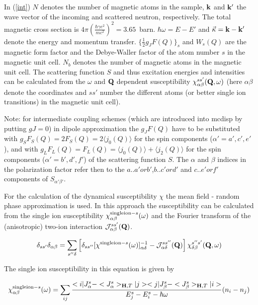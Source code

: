 
In (\ref{int}) 
$N$ denotes the number of magnetic atoms in the sample, $\mathbf k$ and $\mathbf k'$ the wave vector of the incoming and
scattered neutron, respectively.
The total magnetic cross section is $4\pi\left(\frac{\hbar \gamma e^2}{mc^2}\right)^2
=3.65$~barn. 
$\hbar \omega=E-E'$  and
$\vec\kappa =\mathbf k-\mathbf k'$  denote the energy and momentum transfer. $\{\frac{1}{2} g_J F(Q)\}_{s}$ and $W_s(Q)$ are  %
the magnetic form factor and the Debye-Waller
factor of the atom number $s$ in the magnetic unit cell. $N_b$ denotes the number of magnetic
atoms in the magnetic unit cell.
The scattering function $S$ and thus excitation energies and intensities can be calculated from the 
 $\omega$ and $\mathbf Q$ dependent susceptibility $\chi_{\alpha\beta}^{ss'}({\mathbf Q},\omega)$
(here $\alpha\beta$ denote the coordinates and $ss'$ number the different
atoms (or better single ion transitions) in the magnetic unit cell). 

{\tiny Note: for intermediate coupling schemes (which are introduced into mcdisp by putting $gJ=0$) in 
dipole approximation the 
$g_J F(Q)$ have to be substituted with $g_S F_S(Q)=2F_S(Q)=2 \langle j_0 (Q) \rangle$ for the spin components %
($\alpha'=a',c',e'$),
and with  $g_L F_L(Q)=F_L(Q)=\langle j_0 (Q) \rangle + \langle j_2 (Q) \rangle $ 
for the spin components ($\alpha'=b',d',f'$) of the scattering function $S$. The $\alpha$ and $\beta$ indices in 
the polarization factor refer then to  the $a .. a'or b'$,$b ..c'or d'$ and $c .. e'or f'$ components of %
$S_{\alpha'\beta'}$.
}

For the calculation of the 
dynamical susceptibility $\chi$ the 
mean field - random phase approximation is used. 
In this approach the susceptibility can be calculated
from the single ion susceptibility $\chi^{{\rm single ion-} s}_{\alpha\beta}(\omega)$
and the Fourier transform of the (anisotropic) two-ion interaction
${\mathcal J}_{\alpha\beta}^{ss'}({\mathbf Q})$.

\begin{equation}\label{mfrpa}
\delta_{ss'}\delta_{\alpha\beta}=
\sum_{s''\delta}\left[
\delta_{ss''}[\chi^{{\rm single ion-} s}(\omega)]^{-1}_{\alpha\delta}
-{\mathcal J}_{\alpha\delta}^{ss''}({\mathbf Q})
\right]
\chi_{\delta\beta}^{s''s'}({\mathbf Q},\omega)
\end{equation}

The single ion susceptibility in this  equation is given by

\begin{equation}
\label{singleionchi}
\chi^{{\rm single ion-} s}_{\alpha\beta}(\omega)=
\sum_{ij} \frac{<i|J^s_{\alpha}-<J^s_{\alpha}>_{\mbf H,T}|j><j|J^s_{\beta}-<J^s_{\beta}>_{\mbf %
H,T}|i>}{E^s_j-E^s_i-\hbar \omega}
(n_i-n_j)
\end{equation}

